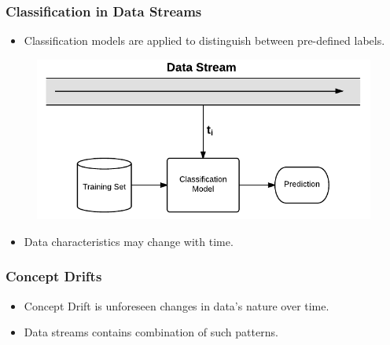 \documentclass[14pt]{beamer}
\begin{document}
\begin{frame}\frametitle{Classification in Data Streams}

\begin{itemize}
\item Classification models are applied to distinguish between pre-defined labels.
\end{itemize}

\vspace{-0.2in}
\begin{figure}
\centering
\includegraphics[scale=0.6]{Stream1}
\end{figure}
\vspace{-0.2in}
\pause
\begin{itemize}
\item \alert{Data characteristics may change with time}.
\end{itemize}
\end{frame}

\begin{frame}\frametitle{Concept Drifts}
\begin{itemize}
\item Concept Drift is unforeseen changes in data's nature over time.
\end{itemize}

\vspace{-0.5in}

\vspace{-0.5in}
\pause

\begin{itemize}
\item Data streams contains combination of such patterns.
\end{itemize}
\end{frame}


\end{document}
